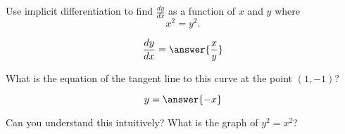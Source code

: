 \documentclass{ximera}
\author{Steven Gubkin}
\begin{document}
\begin{exercise}



Use implicit differentiation to find $\frac{dy}{dx}$ as a function of $x$ and $y$ where
\[
x^2 = y^2.
\]
\begin{prompt}
\[
\frac{dy}{dx} = \answer{\frac{x}{y}}
\]
\end{prompt}
What is the equation of the tangent line to this curve at the point $(1,-1)$?
\begin{prompt}
\[
y = \answer{-x}
\]
\end{prompt}
Can you understand this intuitively?  What is the graph of $y^2 = x^2$?
\end{exercise}
\end{document}
